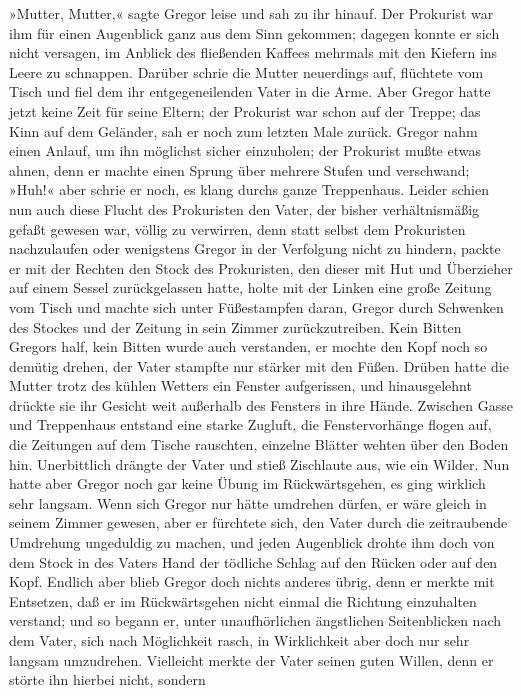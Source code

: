 »Mutter, Mutter,« sagte Gregor leise und sah zu ihr hinauf. Der
Prokurist war ihm für einen Augenblick ganz aus dem Sinn gekommen;
dagegen konnte er sich nicht versagen, im Anblick des fließenden Kaffees
mehrmals mit den Kiefern ins Leere zu schnappen. Darüber schrie die
Mutter neuerdings auf, flüchtete vom Tisch und fiel dem ihr
entgegeneilenden Vater in die Arme. Aber Gregor hatte jetzt keine Zeit
für seine Eltern; der Prokurist war schon auf der Treppe; das Kinn auf
dem Geländer, sah er noch zum letzten Male zurück. Gregor nahm einen
Anlauf, um ihn möglichst sicher einzuholen; der Prokurist mußte etwas
ahnen, denn er machte einen Sprung über mehrere Stufen und verschwand;
»Huh!« aber schrie er noch, es klang durchs ganze Treppenhaus. Leider
schien nun auch diese Flucht des Prokuristen den Vater, der bisher
verhältnismäßig gefaßt gewesen war, völlig zu verwirren, denn statt
selbst dem Prokuristen nachzulaufen oder wenigstens Gregor in der
Verfolgung nicht zu hindern, packte er mit der Rechten den Stock des
Prokuristen, den dieser mit Hut und Überzieher auf einem Sessel
zurückgelassen hatte, holte mit der Linken eine große Zeitung vom Tisch
und machte sich unter Füßestampfen daran, Gregor durch Schwenken des
Stockes und der Zeitung in sein Zimmer zurückzutreiben. Kein Bitten
Gregors half, kein Bitten wurde auch verstanden, er mochte den Kopf noch
so demütig drehen, der Vater stampfte nur stärker mit den Füßen. Drüben
hatte die Mutter trotz des kühlen Wetters ein Fenster aufgerissen, und
hinausgelehnt drückte sie ihr Gesicht weit außerhalb des Fensters in
ihre Hände. Zwischen Gasse und Treppenhaus entstand eine starke Zugluft,
die Fenstervorhänge flogen auf, die Zeitungen auf dem Tische rauschten,
einzelne Blätter wehten über den Boden hin. Unerbittlich drängte der
Vater und stieß Zischlaute aus, wie ein Wilder. Nun hatte aber Gregor
noch gar keine Übung im Rückwärtsgehen, es ging wirklich sehr langsam.
Wenn sich Gregor nur hätte umdrehen dürfen, er wäre gleich in seinem
Zimmer gewesen, aber er fürchtete sich, den Vater durch die zeitraubende
Umdrehung ungeduldig zu machen, und jeden Augenblick drohte ihm doch von
dem Stock in des Vaters Hand der tödliche Schlag auf den Rücken oder auf
den Kopf. Endlich aber blieb Gregor doch nichts anderes übrig, denn er
merkte mit Entsetzen, daß er im Rückwärtsgehen nicht einmal die Richtung
einzuhalten verstand; und so begann er, unter unaufhörlichen ängstlichen
Seitenblicken nach dem Vater, sich nach Möglichkeit rasch, in
Wirklichkeit aber doch nur sehr langsam umzudrehen. Vielleicht merkte
der Vater seinen guten Willen, denn er störte ihn hierbei nicht, sondern
